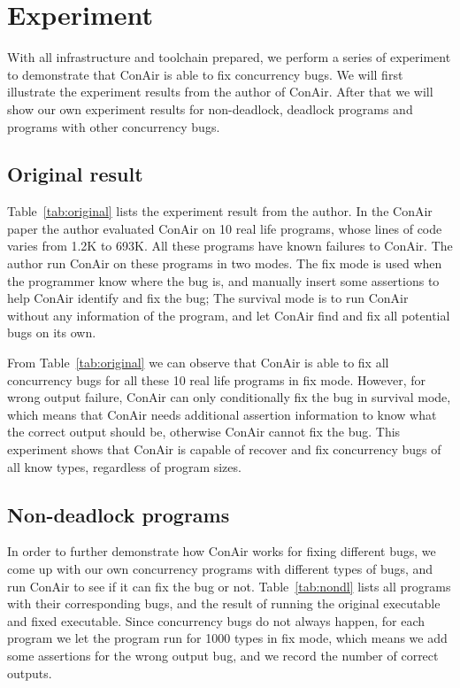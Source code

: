 \section{Experiment}
\label{sec:experiment}
With all infrastructure and toolchain prepared, we perform a series of experiment
to demonstrate that ConAir is able to fix concurrency bugs. We will first
illustrate the experiment results from the author of ConAir. After that we will
show our own experiment results for non-deadlock, deadlock programs and programs
with other concurrency bugs.

\subsection{Original result}
Table~\ref{tab:original} lists the experiment result from the author. In the
ConAir paper the author evaluated ConAir on 10 real life programs, whose lines
of code varies from 1.2K to 693K. All these programs have known failures to
ConAir. The author run ConAir on these programs in two modes. The fix mode is
used when the programmer know where the bug is, and manually insert some
assertions to help ConAir identify and fix the bug; The survival mode is to run
ConAir without any information of the program, and let ConAir find and fix all
potential bugs on its own.



From Table~\ref{tab:original} we can observe that ConAir is able to fix all
concurrency bugs for all these 10 real life programs in fix mode. However, for
wrong output failure, ConAir can only conditionally fix the bug in survival
mode, which means that ConAir needs additional assertion information to know what
the correct output should be, otherwise ConAir cannot fix the bug. This
experiment shows that ConAir is capable of recover and fix concurrency bugs of
all know types, regardless of program sizes.

\subsection{Non-deadlock programs}
In order to further demonstrate how ConAir works for fixing different bugs, we
come up with our own concurrency programs with different types of bugs, and run
ConAir to see if it can fix the bug or not. Table~\ref{tab:nondl} lists all
programs with their corresponding bugs, and the result of running the original
executable and fixed executable. Since concurrency bugs do not always happen,
for each program we let the program run for 1000 types in fix mode, which means
  we add some assertions for the wrong output bug, and we record the number of
  correct outputs.

